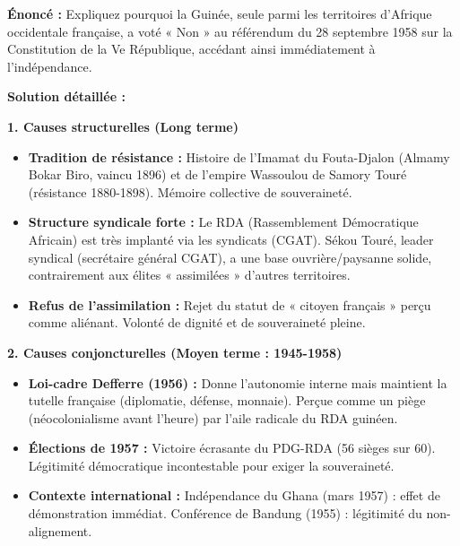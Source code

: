\documentclass[11pt]{article}
\newcommand{\cle}[1]{{\popxbold\color{popdark}#1}}
\begin{document}
\begin{exoresolu}
\textbf{Énoncé :} Expliquez pourquoi la Guinée, seule parmi les territoires d'Afrique occidentale française, a voté « Non » au référendum du 28 septembre 1958 sur la Constitution de la Ve République, accédant ainsi immédiatement à l'indépendance.

\tcblower
\textbf{Solution détaillée :}

\textbf{1. Causes structurelles (Long terme)}
\begin{itemize}
    \item \textbf{Tradition de résistance :} Histoire de l'\cle{Imamat du Fouta-Djalon} (Almamy Bokar Biro, vaincu 1896) et de l'empire \cle{Wassoulou} de \cle{Samory Touré} (résistance 1880-1898). Mémoire collective de souveraineté.
    \item \textbf{Structure syndicale forte :} Le \cle{RDA} (Rassemblement Démocratique Africain) est très implanté via les syndicats (CGAT). \cle{Sékou Touré}, leader syndical (secrétaire général CGAT), a une base ouvrière/paysanne solide, contrairement aux élites « assimilées » d'autres territoires.
    \item \textbf{Refus de l'assimilation :} Rejet du statut de « citoyen français » perçu comme aliénant. Volonté de \cle{dignité} et de \cle{souveraineté pleine}.
\end{itemize}

\textbf{2. Causes conjoncturelles (Moyen terme : 1945-1958)}
\begin{itemize}
    \item \textbf{Loi-cadre Defferre (1956) :} Donne l'autonomie interne mais maintient la tutelle française (diplomatie, défense, monnaie). Perçue comme un piège (\cle{néocolonialisme} avant l'heure) par l'aile radicale du RDA guinéen.
    \item \textbf{Élections de 1957 :} Victoire écrasante du \cle{PDG-RDA} (56 sièges sur 60). Légitimité démocratique incontestable pour exiger la souveraineté.
    \item \textbf{Contexte international :} Indépendance du Ghana (mars 1957) : effet de démonstration immédiat. Conférence de Bandung (1955) : légitimité du non-alignement.
\end{itemize}


\end{exoresolu}
\end{document}
